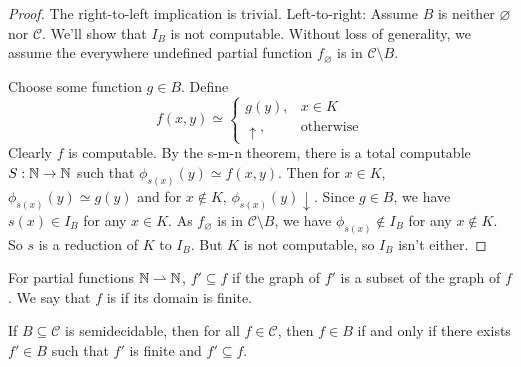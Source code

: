 \begin{proof}
  The right-to-left implication is trivial.
  Left-to-right:
  Assume $B$ is neither $\varnothing$ nor $\mathcal{C}$.
  We'll show that $I_B$ is not computable.
  Without loss of generality, we assume the everywhere undefined partial
  function $f_\varnothing$ is in $\mathcal{C} \setminus B$.

  Choose some function $g \in B$.
  Define
  \[
	f(x,y) \simeq
	\begin{cases}
	  g(y), & x \in K \\
	  \uparrow, & \text{otherwise}
	\end{cases}
  \]
  Clearly $f$ is computable.
  By the s-m-n theorem, there is a total computable $S: \mathbb{N} \to \mathbb{N}$ such that
  $\phi_{s(x)}(y) \simeq f(x,y)$.
  Then for $x \in K$, $\phi_{s(x)}(y) \simeq g(y)$ and for $x \notin K$,
  $\phi_{s(x)}(y) \downarrow$.
  Since $g \in B$, we have $s(x) \in I_B$ for any $x \in K$.
  As $f_\varnothing$ is in $\mathcal{C} \setminus B$, we have $\phi_{s(x)}
  \notin I_B$ for any $x \notin K$.
  So $s$ is a reduction of $K$ to $I_B$.
  But $K$ is not computable, so $I_B$ isn't either.
\end{proof}


\begin{definition}
  For partial functions $\mathbb{N} \rightharpoonup \mathbb{N}$, $f' \subseteq f$ if the graph
  of $f'$ is a subset of the graph of $f$.
  We say that $f$ is  if its domain is finite.
\end{definition}

\begin{theorem}
  If $B \subseteq \mathcal{C}$ is semidecidable, then for all $f \in
  \mathcal{C}$, then $f \in B$ if and only if there exists $f' \in B$ such that
  $f'$ is finite and $f' \subseteq f$.
\end{theorem}

